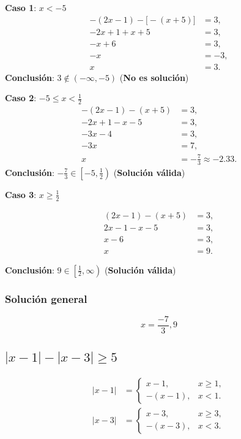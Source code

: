 \textbf{Caso 1}: \(x < -5\)
\begin{align*}
    -(2x-1) - \big[-(x+5)\big] &= 3,\\[1mm]
    -2x+1 + x+5 &= 3,\\[1mm]
    -x+6 &= 3,\\[1mm]
    -x &= -3,\\[1mm]
    x &= 3.
\end{align*}
\textbf{Conclusión}: \(3 \notin (-\infty,-5)\) \quad (\textbf{No es solución})

\textbf{Caso 2}: \(-5 \leq x < \frac{1}{2}\)
\begin{align*}
    -(2x-1) - (x+5) &= 3,\\[1mm]
    -2x+1 - x-5 &= 3,\\[1mm]
    -3x-4 &= 3,\\[1mm]
    -3x &= 7,\\[1mm]
    x &= -\frac{7}{3} \approx -2.33.
\end{align*}
\textbf{Conclusión}: \(-\frac{7}{3} \in \left[-5, \frac{1}{2}\right)\) \quad (\textbf{Solución válida})

\textbf{Caso 3}: \(x \geq \frac{1}{2}\)

\begin{align*}
    (2x-1) - (x+5) &= 3,\\[1mm]
    2x-1 - x-5 &= 3,\\[1mm]
    x-6 &= 3,\\[1mm]
    x &= 9.
\end{align*}

\textbf{Conclusión}: \(9 \in \left[\frac{1}{2}, \infty\right)\) \quad (\textbf{Solución válida})\\
\subsubsection*{Solución general}
\begin{equation*}
    x = \frac{-7}{3}, 9
\end{equation*}




\subsection*{$|x-1|-|x-3|\geq 5$}
\begin{align*}
    |x-1| &= \begin{cases}
        x-1, & x \geq 1, \\
        -(x-1), & x < 1.
    \end{cases} \\
    |x-3| &= \begin{cases}
        x-3, & x \geq 3, \\
        -(x-3), & x < 3.
    \end{cases}
\end{align*}

